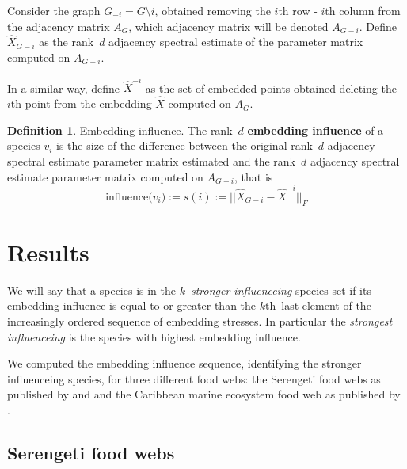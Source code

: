 \documentclass[12pt]{article}
\theoremstyle{definition}
\newtheorem{defn}{Definition}[section]
\begin{document}
Consider the graph $G_{-i} = G \setminus i$, obtained removing the $i\mbox{th}$ row - $i\mbox{th}$ column from the adjacency matrix $A_G$, which adjacency matrix will be denoted $A_{G-i}$. Define $\hat{X}_{G-i}$ as the rank~$d$ adjacency spectral estimate of the parameter matrix computed on $A_{G-i}$.

In a similar way, define $\hat{X}^{-i}$ as the set of embedded points obtained deleting the $i\mbox{th}$ point from the embedding $\hat{X}$  computed on $A_G$.


\begin{defn}{Embedding influence.}
The rank~$d$ \textbf{embedding influence} of a species $v_i$ is the size of the difference between the original rank~$d$ adjacency spectral estimate parameter matrix estimated  and the rank~$d$ adjacency spectral estimate parameter matrix computed on $A_{G-i}$, that is
\[
\mbox{influence($v_i$)} := s(i) := ||\hat{X}_{G-i} - \hat{X}^{-i}||_F
\]
\end{defn}

\section{Results}

We will say that a species is in the $k$~{\em stronger influenceing} species set if its embedding influence is equal to or greater than the $k\mbox{th}$~last element of the increasingly ordered sequence of embedding stresses. In particular the {\em strongest influenceing} is the species with highest embedding influence.

We computed the embedding influence sequence, identifying the stronger influenceing species, for three different food webs: the Serengeti food webs as published by \cite{baskerville2011spatial} and \cite{de2011serengeti} and the Caribbean marine ecosystem food web as published by \cite{rezende2009compartments}.

\subsection{Serengeti food webs}
\end{document}
